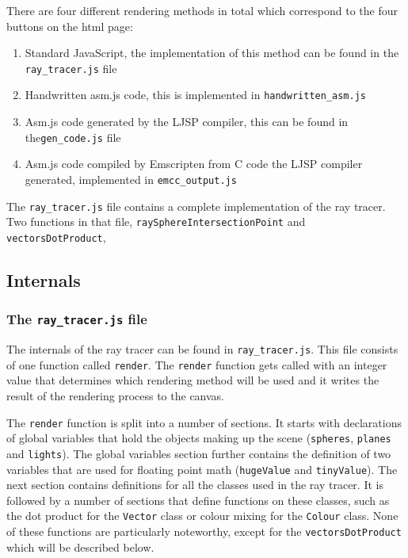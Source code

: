 \documentclass[11pt]{report}
\begin{document}

There are four different rendering methods in total which correspond to the four buttons on the html page:

\begin{enumerate}
\item Standard JavaScript, the implementation of this method can be found in the \texttt{ray_tracer.js} file
\item Handwritten asm.js code, this is implemented in \texttt{handwritten_asm.js}
\item Asm.js code generated by the LJSP compiler, this can be found in the\texttt{gen_code.js} file
\item Asm.js code compiled by Emscripten from C code the LJSP compiler generated, implemented in \texttt{emcc_output.js}
\end{enumerate}
 

The \texttt{ray_tracer.js} file contains a complete implementation of the ray tracer. Two functions in that file, \texttt{raySphereIntersectionPoint} and \texttt{vectorsDotProduct}, 

\subsection{Internals}
\subsubsection{The \texttt{ray_tracer.js} file}
The internals of the ray tracer can be found in \texttt{ray_tracer.js}. This file consists of one function called \texttt{render}. The \texttt{render} function gets called with an integer value that determines which rendering method will be used and it writes the result of the rendering process to the canvas.

The \texttt{render} function is split into a number of sections. It starts with declarations of global variables that hold the objects making up the scene (\texttt{spheres}, \texttt{planes} and \texttt{lights}). The global variables section further contains the definition of two variables that are used for floating point math (\texttt{hugeValue} and \texttt{tinyValue}). The next section contains definitions for all the classes used in the ray tracer. It is followed by a number of sections that define functions on these classes, such as the dot product for the \texttt{Vector} class or colour mixing for the \texttt{Colour} class. None of these functions are particularly noteworthy, except for the \texttt{vectorsDotProduct} which will be described below.
\end{document}
